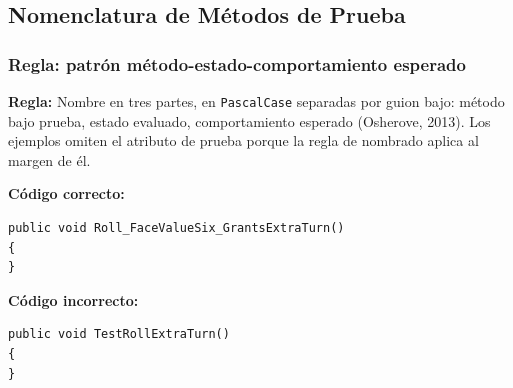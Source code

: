 \subsection{Nomenclatura de Métodos de Prueba}

\subsubsection{Regla: patrón método-estado-comportamiento esperado}

\textbf{Regla:} Nombre en tres partes, en \texttt{PascalCase} separadas por guion bajo: método bajo prueba, estado evaluado, comportamiento esperado (Osherove, 2013). Los ejemplos omiten el atributo de prueba porque la regla de nombrado aplica al margen de él.

\textbf{Código correcto:}
\begin{lstlisting}[style=csharpstyle]
public void Roll_FaceValueSix_GrantsExtraTurn()
{
}
\end{lstlisting}

\textbf{Código incorrecto:}
\begin{lstlisting}[style=csharpstyle]
public void TestRollExtraTurn()
{
}
\end{lstlisting}
